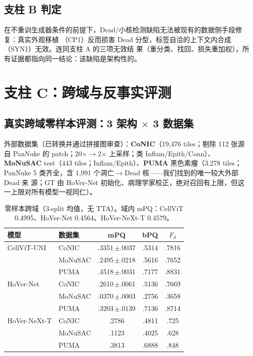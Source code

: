 \documentclass[11pt]{article}
\begin{document}
\subsection{支柱 B 判定}
在不重训生成器条件的前提下，Dead/小核检测缺陷无法被现有的数据侧手段修复：真实外观移植
（CP1）反而损害 Dead 分型，标签自洽的上下文内合成（SYN1）无效。连同支柱 A 的三项无效结
果（重分类、找回、损失重加权），所有证据都指向同一结论：该缺陷是架构性的。

\section{支柱 C：跨域与反事实评测}
\label{sec:pillarC}

\subsection{真实跨域零样本评测：3 架构 $\times$ 3 数据集}
\label{sec:external}

外部数据集（已转换并通过拼接图审查）：\textbf{CoNIC}（19,476 tiles；剔除 112 张源自
PanNuke 的 patch；20$\times\rightarrow$2$\times$ 上采样；类 Inflam/Epith/Conn）、
\textbf{MoNuSAC} test（443 tiles；Inflam/Epith）、\textbf{PUMA} 黑色素瘤（3,278 tiles；
PanNuke 5 类齐全，含 1,991 个凋亡$\rightarrow$Dead 核——我们找到的唯一较大外部 Dead 来
源；GT 由 HoVer-Net 初始化、病理学家校正，绝对召回有上限，但这一上限对所有模型一视同仁）。

\begin{table}[t]
\centering\small
\caption{零样本跨域（3-split 均值，无 TTA）。域内 mPQ：CellViT 0.4995、HoVer-Net
0.4564、HoVer-NeXt-T 0.4579。}
\label{tab:external}
\begin{tabular}{llccc}
\toprule
模型 & 数据集 & mPQ & bPQ & $F_d$ \\
\midrule
CellViT-UNI  & CoNIC   & .3351\,$\pm$.0037 & .5314 & .7816 \\
             & MoNuSAC & .2495\,$\pm$.0218 & .5616 & .7652 \\
             & PUMA    & .4518\,$\pm$.0031 & .7177 & .8831 \\
\midrule
HoVer-Net    & CoNIC   & .2610\,$\pm$.0061 & .5136 & .7669 \\
             & MoNuSAC & .0370\,$\pm$.0003 & .2756 & .3658 \\
             & PUMA    & .3203\,$\pm$.0139 & .7136 & .8714 \\
\midrule
HoVer-NeXt-T & CoNIC   & .2786 & .4811 & .725 \\
             & MoNuSAC & .1123 & .4025 & .628 \\
             & PUMA    & .3813 & .6888 & .848 \\
\bottomrule
\end{tabular}
\end{table}
\end{document}
